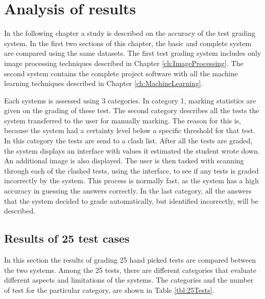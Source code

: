 \chapter{Analysis of results}
\label{ch:Results}
\ifpdf
\graphicspath{{Chapter5/Chapter5Figures/}}
\fi

In the following chapter a study is described on the accuracy of the test grading system. In the first two sections of this chapter, the basic and complete system are compared using the same datasets. The first test grading system includes only image processing techniques described in Chapter \ref{ch:ImageProcessing}. The second system contains the complete project software with all the machine learning techniques described in Chapter \ref{ch:MachineLearning}.

Each systems is assessed using 3 categories. In category 1, marking statistics are given on the grading of these test. The second category describes all the tests the system transferred to the user for manually marking. The reason for this is, because the system had a certainty level below a specific threshold for that test. In this category the tests are send to a clash list. After all the tests are graded, the system displays an interface with values it estimated the student wrote down. An additional image is also displayed. The user is then tasked with scanning through each of the clashed tests, using the interface, to see if any tests is graded incorrectly by the system. This process is normally fast, as the system has a high accuracy in guessing the answers correctly. In the last category, all the answers that the system decided to grade automatically, but identified incorrectly, will be described.

\section{Results of 25 test cases}

In this section the results of grading 25 hand picked tests are compared between the two systems. Among the 25 tests, there are different categories that evaluate different aspects and limitations of the systems. The categories and the number of test for the particular category, are shown in Table \ref{tbl:25Tests}.

